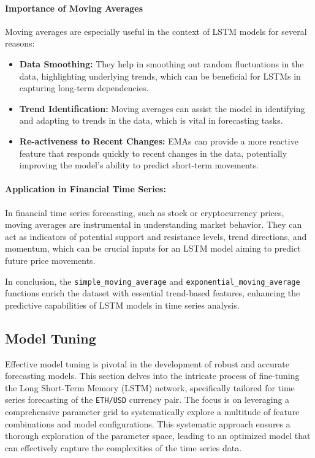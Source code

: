 \paragraph{Importance of Moving Averages}
Moving averages are especially useful in the context of LSTM models for several reasons:
\begin{itemize}
    \item \textbf{Data Smoothing:} They help in smoothing out random fluctuations in the data, highlighting underlying trends, which can be beneficial for LSTMs in capturing long-term dependencies.
    \item \textbf{Trend Identification:} Moving averages can assist the model in identifying and adapting to trends in the data, which is vital in forecasting tasks.
    \item \textbf{Re-activeness to Recent Changes:} EMAs can provide a more reactive feature that responds quickly to recent changes in the data, potentially improving the model's ability to predict short-term movements.
\end{itemize}

\paragraph{Application in Financial Time Series:}
In financial time series forecasting, such as stock or cryptocurrency prices, moving averages are instrumental in understanding market behavior. They can act as indicators of potential support and resistance levels, trend directions, and momentum, which can be crucial inputs for an LSTM model aiming to predict future price movements.

In conclusion, the \texttt{simple\_moving\_average} and \texttt{exponential\_moving\_average} functions enrich the dataset with essential trend-based features, enhancing the predictive capabilities of LSTM models in time series analysis.


\subsection{Model Tuning}
\label{section:model_tuning}

Effective model tuning is pivotal in the development of robust and accurate forecasting models. This section delves into the intricate process of fine-tuning the Long Short-Term Memory (LSTM) network, specifically tailored for time series forecasting of the \texttt{ETH/USD} currency pair. The focus is on leveraging a comprehensive parameter grid to systematically explore a multitude of feature combinations and model configurations. This systematic approach ensures a thorough exploration of the parameter space, leading to an optimized model that can effectively capture the complexities of the time series data. \\

